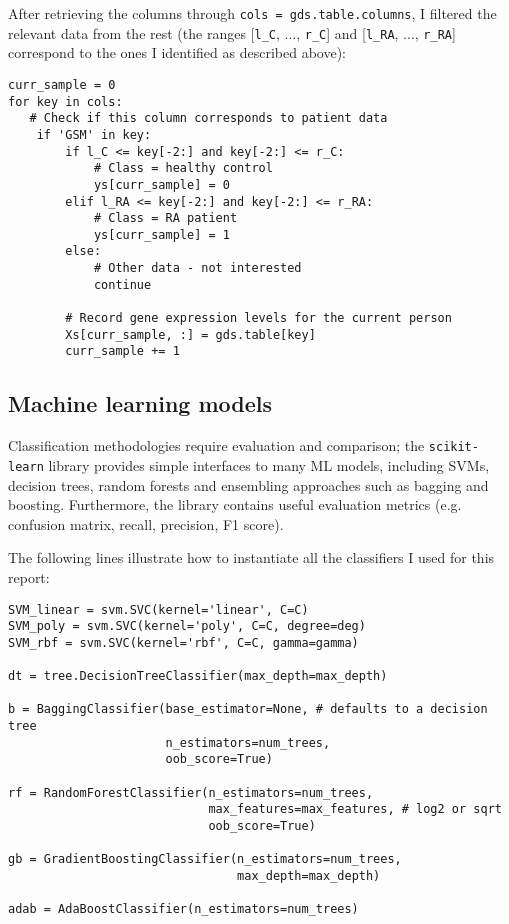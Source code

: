 \documentclass[11pt]{article}
\numberwithin{equation}{section}
\begin{document}
After retrieving the columns through \texttt{cols = gds.table.columns}, I filtered the relevant data from the rest (the ranges [\texttt{l\_C}, ..., \texttt{r\_C}] and [\texttt{l\_RA}, ..., \texttt{r\_RA}] correspond to the ones I identified as described above):
\begin{verbatim}
curr_sample = 0
for key in cols:
   # Check if this column corresponds to patient data
    if 'GSM' in key:
        if l_C <= key[-2:] and key[-2:] <= r_C:
            # Class = healthy control
            ys[curr_sample] = 0
        elif l_RA <= key[-2:] and key[-2:] <= r_RA:
            # Class = RA patient
            ys[curr_sample] = 1
        else:
            # Other data - not interested
            continue
        
        # Record gene expression levels for the current person
        Xs[curr_sample, :] = gds.table[key]
        curr_sample += 1
\end{verbatim}

\subsection{Machine learning models}

Classification methodologies require evaluation and comparison; the \texttt{scikit-learn} library \cite{scikit-learn} provides simple interfaces to many ML models, including SVMs, decision trees, random forests and ensembling approaches such as bagging and boosting. Furthermore, the library contains useful evaluation metrics (e.g. confusion matrix, recall, precision, F1 score).

The following lines illustrate how to instantiate all the classifiers I used for this report:
\begin{verbatim}
SVM_linear = svm.SVC(kernel='linear', C=C)
SVM_poly = svm.SVC(kernel='poly', C=C, degree=deg)
SVM_rbf = svm.SVC(kernel='rbf', C=C, gamma=gamma)

dt = tree.DecisionTreeClassifier(max_depth=max_depth)

b = BaggingClassifier(base_estimator=None, # defaults to a decision tree
                      n_estimators=num_trees,
                      oob_score=True)
                      
rf = RandomForestClassifier(n_estimators=num_trees,
                            max_features=max_features, # log2 or sqrt
                            oob_score=True)

gb = GradientBoostingClassifier(n_estimators=num_trees,
                                max_depth=max_depth)

adab = AdaBoostClassifier(n_estimators=num_trees)
\end{verbatim}
\end{document}
